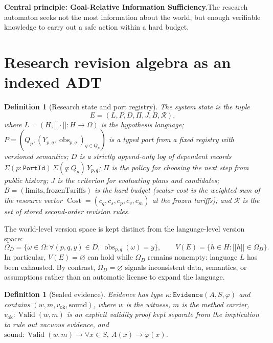 \documentclass[11pt,a4paper]{article}
\theoremstyle{preprintthm}
\theoremstyle{preprintdef}
\newtheorem{definition}[theorem]{Definition}
\newcommand{\takeaway}[2]{%
  \vspace{4pt}\noindent\colorbox{bgbox}{%
    \parbox{\dimexpr\linewidth-2\fboxsep\relax}{%
      \vspace{3pt}\textbf{\color{primary}#1.}\hspace{0.4em}#2\vspace{3pt}%
    }%
  }\vspace{4pt}%
}
\newcommand{\Cost}{\operatorname{Cost}}
\newcommand{\obs}{\operatorname{obs}}
\newcommand{\Valid}{\operatorname{Valid}}
\providecommand{\llbracket}{\mathopen{[\![}}
\providecommand{\rrbracket}{\mathclose{]\!]}}
\begin{document}
\takeaway{Central principle: Goal-Relative Information Sufficiency}{The research automaton seeks not the most information about the world, but enough verifiable knowledge to carry out a safe action within a hard budget.}

\section{Research revision algebra as an indexed ADT}

\begin{definition}[Research state and port registry]
The system state is the tuple
\begin{equation}
  E = (L, P, D, \Pi, J, B, \mathcal{R}),
\end{equation}
where $L=(H,\llbracket\cdot\rrbracket:H\to\Omega)$ is the hypothesis language; $P=(Q_p,(Y_{p,q},\obs_{p,q})_{q\in Q_p})$ is a typed port from a fixed registry with versioned semantics; $D$ is a strictly append-only log of dependent records $\Sigma(p:\texttt{PortId})\,\Sigma(q:Q_p)\,Y_{p,q}$; $\Pi$ is the policy for choosing the next step from public history; $J$ is the criterion for evaluating plans and candidates; $B=(\mathrm{limits},\mathrm{frozenTariffs})$ is the hard budget (scalar cost is the weighted sum of the resource vector $\Cost=(c_q,c_s,c_p,c_v,c_m)$ at the frozen tariffs); and $\mathcal R$ is the set of stored second-order revision rules.
\end{definition}

The world-level version space is kept distinct from the language-level version space:
\begin{equation}
  \Omega_D = \{\omega\in\Omega : \forall (p,q,y)\in D,\ \obs_{p,q}(\omega)=y\},
  \qquad
  V(E) = \{h\in H : \llbracket h\rrbracket \in \Omega_D\}.
\end{equation}
In particular, $V(E)=\varnothing$ can hold while $\Omega_D$ remains nonempty: language $L$ has been exhausted. By contrast, $\Omega_D=\varnothing$ signals inconsistent data, semantics, or assumptions rather than an automatic license to expand the language.

\begin{definition}[Sealed evidence]
Evidence has type $\kappa:\texttt{Evidence}(A,S,\varphi)$ and contains $(w,m,v_{\mathrm{ok}},\mathrm{sound})$, where $w$ is the witness, $m$ is the method carrier, $v_{\mathrm{ok}}:\Valid(w,m)$ is an explicit validity proof kept separate from the implication to rule out vacuous evidence, and $\mathrm{sound}:\Valid(w,m)\to\forall x\in S,\ A(x)\to\varphi(x)$.
\end{definition}
\end{document}
